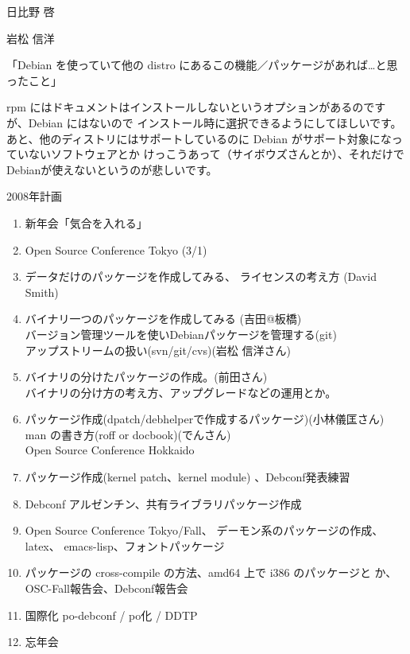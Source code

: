 \documentclass[cjk,dvipdfmx,12pt]{beamer}
\begin{document}
\begin{frame}{日比野 啓}
\end{frame}\begin{frame}{岩松 信洋}

「Debian を使っていて他の distro にあるこの機能／パッケージがあれば…と思ったこと」

rpm にはドキュメントはインストールしないというオプションがあるのですが、Debian にはないので
インストール時に選択できるようにしてほしいです。
あと、他のディストリにはサポートしているのに Debian がサポート対象になっていないソフトウェアとか
けっこうあって（サイボウズさんとか）、それだけでDebianが使えないというのが悲しいです。


\end{frame}




\begin{frame}{2008年計画}

{\scriptsize
\begin{enumerate}
 \item 新年会「気合を入れる」
 \item Open Source Conference Tokyo (3/1)
 \item データだけのパッケージを作成してみる、
       ライセンスの考え方 (David Smith)
 \item バイナリ一つのパッケージを作成してみる (吉田@板橋)\\
       バージョン管理ツールを使いDebianパッケージを管理する(git)\\
       アップストリームの扱い(svn/git/cvs)(岩松 信洋さん)
 \item バイナリの分けたパッケージの作成。(前田さん)\\
       バイナリの分け方の考え方、アップグレードなどの運用とか。
 \item パッケージ作成(dpatch/debhelperで作成するパッケージ)(小林儀匡さん)\\
       man の書き方(roff or docbook)(でんさん)\\
       Open Source Conference Hokkaido
 \item パッケージ作成(kernel patch、kernel module)
       、Debconf発表練習
 \item Debconf アルゼンチン、共有ライブラリパッケージ作成

 \item Open Source Conference Tokyo/Fall、
       デーモン系のパッケージの作成、latex、 emacs-lisp、フォントパッケージ
 \item パッケージの cross-compile の方法、amd64 上で i386 のパッケージと
       か、OSC-Fall報告会、Debconf報告会
 \item 国際化 po-debconf / po化 / DDTP
 \item 忘年会
\end{enumerate}
}
\end{frame}
\end{document}
